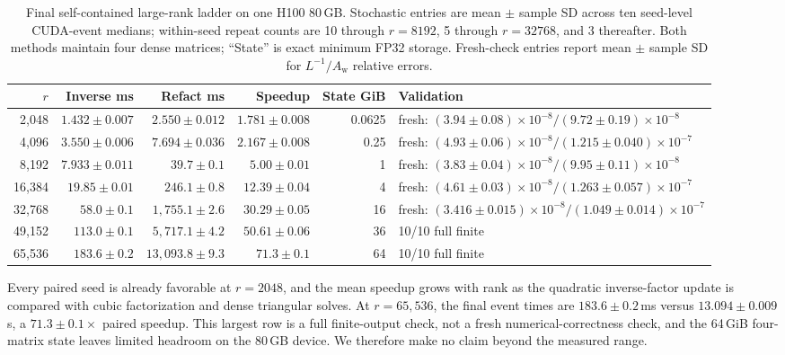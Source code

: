 \documentclass[11pt]{article}
\newcommand{\Aw}{A_{\mathrm w}}
\begin{document}
\begin{table}[ht]
\centering
\scriptsize
\caption{Final self-contained large-rank ladder on one H100 80\,GB.
Stochastic entries are mean \(\pm\) sample SD across ten seed-level
CUDA-event medians; within-seed repeat counts are 10 through \(r=8192\), 5
through \(r=32768\), and 3 thereafter.  Both methods maintain four dense
matrices; ``State'' is exact minimum FP32 storage.  Fresh-check entries report
mean \(\pm\) sample SD for \(L^{-1}/\Aw\) relative errors.}
\label{tab:e5-large-scale}
{\setlength{\tabcolsep}{2.5pt}
\begin{tabular}{@{}rrrrrl@{}}
\toprule
\(r\) & Inverse ms & Refact ms & Speedup & State GiB & Validation \\
\midrule
2,048  & \(1.432\pm0.007\) & \(2.550\pm0.012\) &
  \(1.781\pm0.008\) & 0.0625 &
  fresh: \((3.94\pm0.08)\times10^{-8}/(9.72\pm0.19)\times10^{-8}\) \\
4,096  & \(3.550\pm0.006\) & \(7.694\pm0.036\) &
  \(2.167\pm0.008\) & 0.25 &
  fresh: \((4.93\pm0.06)\times10^{-8}/(1.215\pm0.040)\times10^{-7}\) \\
8,192  & \(7.933\pm0.011\) & \(39.7\pm0.1\) &
  \(5.00\pm0.01\) & 1 &
  fresh: \((3.83\pm0.04)\times10^{-8}/(9.95\pm0.11)\times10^{-8}\) \\
16,384 & \(19.85\pm0.01\) & \(246.1\pm0.8\) &
  \(12.39\pm0.04\) & 4 &
  fresh: \((4.61\pm0.03)\times10^{-8}/(1.263\pm0.057)\times10^{-7}\) \\
32,768 & \(58.0\pm0.1\) & \(1{,}755.1\pm2.6\) &
  \(30.29\pm0.05\) & 16 &
  fresh: \((3.416\pm0.015)\times10^{-8}/(1.049\pm0.014)\times10^{-7}\) \\
49,152 & \(113.0\pm0.1\) & \(5{,}717.1\pm4.2\) &
  \(50.61\pm0.06\) & 36 & 10/10 full finite \\
65,536 & \(183.6\pm0.2\) & \(13{,}093.8\pm9.3\) &
  \(71.3\pm0.1\) & 64 & 10/10 full finite \\
\bottomrule
\end{tabular}
}
\end{table}

Every paired seed is already favorable at \(r=2048\), and the mean speedup
grows with rank as the quadratic inverse-factor update is compared with cubic
factorization and dense triangular solves.  At \(r=65{,}536\), the final event
times are \(183.6\pm0.2\)\,ms versus \(13.094\pm0.009\)\,s, a
\(71.3\pm0.1\times\) paired speedup.  This
largest row is a full finite-output check, not a fresh numerical-correctness
check, and the 64\,GiB four-matrix state leaves limited headroom on the
80\,GB device.  We therefore make no claim beyond the measured range.
\end{document}
